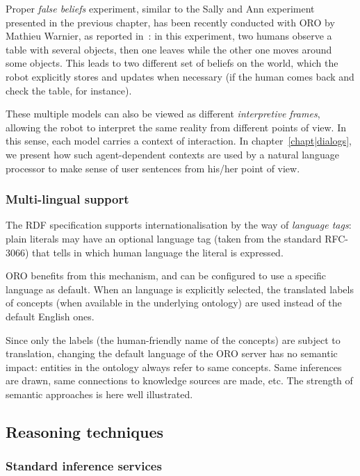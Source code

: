 Proper \emph{false beliefs} experiment, similar to the Sally and Ann experiment
presented in the previous chapter, has been recently conducted with ORO
by Mathieu Warnier, as reported in~\cite{Warnier2012a}: in this experiment, two
humans observe a table with several objects, then one leaves while the other
one moves around some objects. This leads to two different set of beliefs on
the world, which the robot explicitly stores and updates when necessary (if the
human comes back and check the table, for instance).

These multiple models can also be viewed as different \emph{interpretive
frames}, allowing the robot to interpret the same reality from different points
of view. In this sense, each model carries a context of interaction.  In
chapter~\ref{chapt|dialogs}, we present how such agent-dependent contexts are
used by a natural language processor to make sense of user sentences from
his/her point of view.

\subsubsection{Multi-lingual support}
\label{sect|multilingual}

The RDF specification supports internationalisation by the way of
\emph{language tags}: plain literals may have an optional language tag (taken
from the standard RFC-3066) that tells in which human language the literal is
expressed.

ORO benefits from this mechanism, and can be configured to use a specific
language as default. When an language is explicitly selected, the translated
labels of concepts (when available in the underlying ontology) are used instead
of the default English ones.

Since only the labels (\ie the human-friendly name of the concepts) are subject
to translation, changing the default language of the ORO server has no semantic
impact: entities in the ontology always refer to same concepts. Same inferences
are drawn, same connections to knowledge sources are made, etc. The strength of
semantic approaches is here well illustrated.

\subsection{Reasoning techniques}

\subsubsection{Standard inference services}

